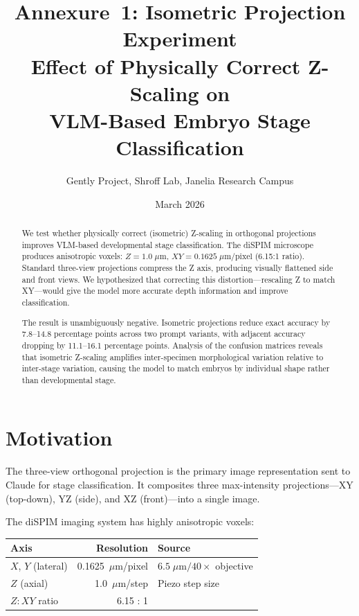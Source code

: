 \documentclass[11pt, a4paper]{article}
\title{%
  \sffamily\bfseries
  Annexure~1: Isometric Projection Experiment\\[4pt]
  \Large Effect of Physically Correct Z-Scaling on\\
  VLM-Based Embryo Stage Classification
}
\author{%
  Gently Project, Shroff Lab, Janelia Research Campus
}
\date{March 2026}
\begin{document}
\maketitle

\begin{abstract}
We test whether physically correct (isometric) Z-scaling in orthogonal
projections improves VLM-based developmental stage classification.  The diSPIM
microscope produces anisotropic voxels: $Z = 1.0\;\mu\text{m}$,
$XY = 0.1625\;\mu\text{m/pixel}$ (6.15:1 ratio).  Standard three-view
projections compress the Z axis, producing visually flattened side and front
views.  We hypothesized that correcting this distortion---rescaling Z to match
XY---would give the model more accurate depth information and improve
classification.

The result is unambiguously negative.  Isometric projections reduce exact
accuracy by 7.8--14.8 percentage points across two prompt variants, with
adjacent accuracy dropping by 11.1--16.1 percentage points.  Analysis of the
confusion matrices reveals that isometric Z-scaling amplifies inter-specimen
morphological variation relative to inter-stage variation, causing the model to
match embryos by individual shape rather than developmental stage.
\end{abstract}

\section{Motivation}

The three-view orthogonal projection is the primary image representation sent
to Claude for stage classification.  It composites three max-intensity
projections---XY (top-down), YZ (side), and XZ (front)---into a single image.

The diSPIM imaging system has highly anisotropic voxels:

\begin{center}
\begin{tabular}{@{}lrl@{}}
\toprule
\textbf{Axis} & \textbf{Resolution} & \textbf{Source} \\
\midrule
$X$, $Y$ (lateral) & 0.1625~$\mu$m/pixel & $6.5\;\mu\text{m} / 40\times$ objective \\
$Z$ (axial)        & 1.0~$\mu$m/step     & Piezo step size \\
\midrule
$Z : XY$ ratio     & 6.15 : 1            & \\
\bottomrule
\end{tabular}
\end{center}
\end{document}
